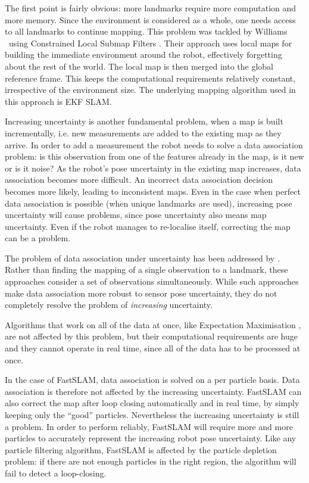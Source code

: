 The first point is fairly obvious: more landmarks require more
computation and more memory. Since the environment is considered as a
whole, one needs access to all landmarks to continue mapping. This
problem was tackled by Williams \etal\ using Constrained Local Submap
Filters \cite{williams:acra2001}. Their approach uses local maps for
building the immediate environment around the robot, effectively
forgetting about the rest of the world. The local map is then merged
into the global reference frame. This keeps the computational
requirements relatively constant, irrespective of the environment
size. The underlying mapping algorithm used in this approach is EKF
SLAM.

Increasing uncertainty is another fundamental problem, when a map is
built incrementally, i.e. new measurements are added to the existing
map as they arrive. In order to add a measurement the robot needs to
solve a data association problem: is this observation from one of the
features already in the map, is it new or is it noise?  As the robot's
pose uncertainty in the existing map increases, data association
becomes more difficult. An incorrect data association decision becomes
more likely, leading to inconsistent maps. Even in the case when
perfect data association is possible (when unique landmarks are used),
increasing pose uncertainty will cause problems, since pose
uncertainty also means map uncertainty. Even if the robot manages to
re-localise itself, correcting the map can be a problem.

The problem of data association under uncertainty has been addressed
by \cite{neira01:_data_assoc_stoch_mappin_using,
  tardos02:_mappin_local_indoor_envir_using_sonar_data}.  Rather than
finding the mapping of a single observation to a landmark, these
approaches consider a set of observations simultaneously. While such
approaches make data association more robust to sensor pose
uncertainty, they do not completely resolve the problem of {\it
  increasing} uncertainty.


Algorithms that work on all of the data at once, like Expectation
Maximisation \cite{thrun98:_probab}, are not affected by this problem,
but their computational requirements are huge and they cannot operate
in real time, since all of the data has to be processed at once.

In the case of FastSLAM, data association is solved on a per particle
basis. Data association is therefore not affected by the increasing
uncertainty. FastSLAM can also correct the map after loop closing
automatically and in real time, by simply keeping only the ``good''
particles. Nevertheless the increasing uncertainty is still a
problem. In order to perform reliably, FastSLAM will require more and
more particles to accurately represent the increasing robot pose
uncertainty. Like any particle filtering algorithm, FastSLAM is
affected by the particle depletion problem: if there are not enough
particles in the right region, the algorithm will fail to detect a
loop-closing.

